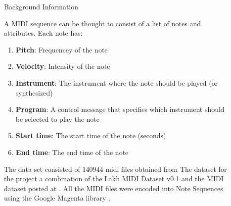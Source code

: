 \documentclass[final]{beamer}
\newlength{\sepwid}
\newlength{\onecolwid}
\newlength{\twocolwid}
\begin{document}
\begin{frame}[t]
\begin{columns}[t]
\begin{column}{\onecolwid}

\begin{block}{Background Information}

A MIDI sequence can be thought to consist of a list of notes and attributes. Each note has:

\begin{enumerate}
\item \textbf{Pitch}: Frequencey of the note
\item \textbf{Velocity}: Intensity of the note
\item \textbf{Instrument}: The instrument where the note should be played (or synthesized) 
\item \textbf{Program}: A control message that specifies which instrument should be selected to play the note
\item \textbf{Start time}: The start time of the note (seconds)
\item \textbf{End time}: The end time of the note          
\end{enumerate}

The data set consisted of $140944$ midi files obtained from The dataset for the project a combination of the Lakh MIDI Dataset v0.1 \cite{colinlmd} and the MIDI dataset posted at \cite{midiman}. All the MIDI files were encoded into Note Sequences using the Google Magenta library \cite{magenta}.



\end{block}
\end{column} %


\begin{column}{\sepwid}\end{column} %

\begin{column}{\twocolwid} %

\begin{columns}[t,totalwidth=\twocolwid] %

\begin{column}{\onecolwid}\vspace{-.6in} %





\end{column}
\end{columns}
\end{column}
\end{columns}
\end{frame}
\end{document}
